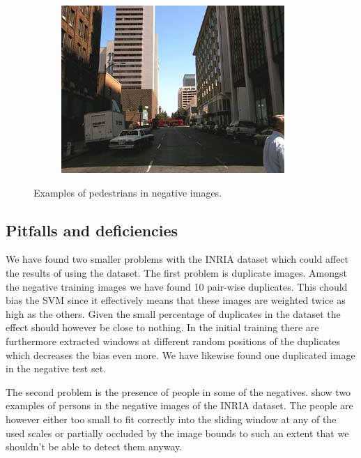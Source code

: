 \documentclass[thesis.tex]{subfiles}
\begin{document}
\begin{figure}[p]
\begin{subfigure}[t]{0.495\textwidth}
	\end{subfigure}
	\begin{subfigure}[t]{0.495\textwidth}
		\includegraphics[width=\textwidth]{img/inriaManOccluded.png}
	\end{subfigure}
	\caption{Examples of pedestrians in negative images.}
	\label{fig:inriaNegativePersons}
\end{figure}
\restoregeometry

\subsection{Pitfalls and deficiencies}
We have found two smaller problems with the INRIA dataset which could affect the results of using the dataset. The first problem is duplicate images. Amongst the negative training images we have found 10 pair-wise duplicates. This chould bias the SVM since it effectively means that these images are weighted twice as high as the others. Given the small percentage of duplicates in the dataset the effect should however be close to nothing. In the initial training there are furthermore extracted windows at different random positions of the duplicates which decreases the bias even more. We have likewise found one duplicated image in the negative test set.

The second problem is the presence of people in some of the negatives.
 show two examples of persons in the negative images of the INRIA dataset. The people are however either too small to fit correctly into the sliding window at any of the used scales or partially occluded by the image bounds to such an extent that we shouldn't be able to detect them anyway.
\end{document}
